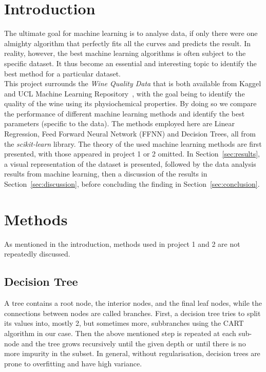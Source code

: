 \documentclass[english,notitlepage,reprint,nofootinbib]{revtex4-1}
\begin{document}
\section{Introduction}
The ultimate goal for machine learning is to analyse data, if only there were one almighty algorithm that perfectly fits all the curves and predicts the result. In reality, however, the best machine learning algorithms is often subject to the specific dataset. It thus become an essential and interesting topic to identify the best method for a particular dataset.\\
This project surrounds the \textit{Wine Quality Data} \cite{CORTEZ2009547} that is both available from Kaggel \cite{learning_2017} and UCL Machine Learning Repository~\cite{uci2009}, with the goal being to identify the quality of the wine using its physiochemical properties. By doing so we compare the performance of different machine learning methods and identify the best parameters (specific to the data). The methods employed here are Linear Regression, Feed Forward Neural Network (FFNN) and Decision Trees, all from the \textit{scikit-learn} library. The theory of the used machine learning methods are first presented, with those appeared in project 1 or 2 omitted. In Section~\ref{sec:results}, a visual representation of the dataset is presented, followed by the data analysis results from machine learning, then a discussion of the results in Section~\ref{sec:discussion}, before concluding the finding in Section~\ref{sec:conclusion}.

%

\section{Methods}\label{sec:methods}
%
As mentioned in the introduction, methods used in project 1 and 2 are not repeatedly discussed. 

\subsection{Decision Tree}
A tree contains a root node, the interior nodes, and the final leaf nodes, while the connections between nodes are called branches. First, a decision tree tries to split its values into, mostly 2, but sometimes more, subbranches using the CART algorithm in our case. Then the above mentioned step is repeated at each sub-node and the tree grows recursively until the given depth or until there is no more impurity in the subset. In general, without regularisation, decision trees are prone to overfitting and have high variance.
\end{document}
